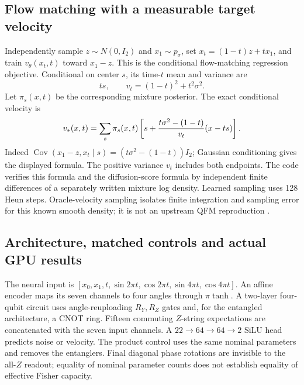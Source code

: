 \documentclass[11pt,oneside,openany]{book}
\theoremstyle{definition}\newtheorem{definition}[theorem]{Definition}
\theoremstyle{remark}\newtheorem{remark}[theorem]{Remark}
\begin{document}
\subsection{Flow matching with a measurable target velocity}
Independently sample $z\sim N(0,I_2)$ and $x_1\sim p_\sigma$, set
$x_t=(1-t)z+tx_1$, and train $v_\theta(x_t,t)$ toward $x_1-z$.
This is the conditional flow-matching regression objective. Conditional on
center $s$, its time-$t$ mean and variance are
\[
 ts,\qquad v_t=(1-t)^2+t^2\sigma^2.
\]
Let $\pi_s(x,t)$ be the corresponding mixture posterior. The exact conditional
velocity is
\[
 v_*(x,t)=\sum_s\pi_s(x,t)\left[
 s+{t\sigma^2-(1-t)\over v_t}(x-ts)\right].
\]
Indeed $\operatorname{Cov}(x_1-z,x_t\mid s)=
(t\sigma^2-(1-t))I_2$; Gaussian conditioning gives the displayed formula.
The positive variance $v_t$ includes both endpoints. The code verifies this
formula and the diffusion-score formula by independent finite differences
of a separately written mixture log density. Learned sampling uses 128 Heun
steps. Oracle-velocity sampling isolates finite integration and sampling
error for this known smooth density; it is not an upstream QFM reproduction
\cite{LFQFM}.

\subsection{Architecture, matched controls and actual GPU results}
The neural input is
$[x_0,x_1,t,\sin2\pi t,\cos2\pi t,\sin4\pi t,\cos4\pi t]$.
An affine encoder maps its seven channels to four angles through $\pi\tanh$.
A two-layer four-qubit circuit uses angle-reuploading $R_Y,R_Z$ gates and,
for the entangled architecture, a CNOT ring. Fifteen commuting $Z$-string
expectations are concatenated with the seven input channels. A
$22\to64\to64\to2$ SiLU head predicts noise or velocity. The product control
uses the same nominal parameters and removes the entanglers. Final diagonal
phase rotations are invisible to the all-$Z$ readout; equality of nominal
parameter counts does not establish equality of effective Fisher capacity.
\end{document}
